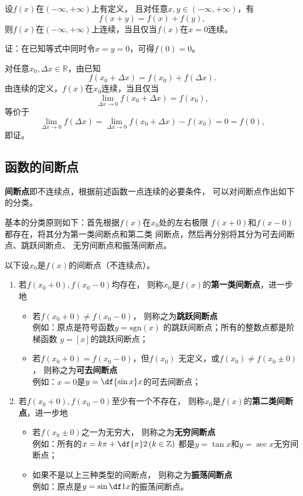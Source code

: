 \bs
\egz 
设$f(x)$在$(-\infty,+\infty)$上有定义，
且对任意$x,y\in (-\infty,+\infty)$，有
$$f(x+y)=f(x)+f(y),$$
则$f(x)$在$(-\infty,+\infty)$上连续，当且仅当$f(x)$在$x=0$连续。

证：在已知等式中同时令$x=y=0$，可得$f(0)=0$。

对任意$x_0,\Delta x\in\mathbb{R}$，由已知
$$f(x_0+\Delta x)=f(x_0)+f(\Delta x).$$
由连续的定义，$f(x)$在$x_0$连续，当且仅当
$$\lim\limits_{\Delta x\to 0}f(x_0+\Delta x)=f(x_0),$$
等价于
$$\lim\limits_{\Delta x\to 0}f(\Delta x)
=\lim\limits_{\Delta x\to 0}f(x_0+\Delta x)-f(x_0)=0=f(0),$$
即证。\fin


\subsection{函数的间断点}

{\bf 间断点}即不连续点，根据前述函数一点连续的必要条件，
可以对间断点作出如下的分类。

基本的分类原则如下：首先根据$f(x)$在$x_0$处的左右极限
$f(x+0)$和$f(x-0)$都存在，将其分为第一类间断点和第二类
间断点，然后再分别将其分为可去间断点、跳跃间断点、
无穷间断点和振荡间断点。

\begin{thx}
	以下设$x_0$是$f(x)$的间断点（不连续点）。
	\begin{enumerate}[(1)]
		\item 若$f(x_0+0),f(x_0-0)$均存在，
		则称$x_0$是$f(x)$的{\bf 第一类间断点}，进一步地
		\begin{itemize}
			\item 若$f(x_0+0)\ne f(x_0-0)$，
			则称之为{\bf 跳跃间断点}\\
			\quad 例如：原点是符号函数$y=\mathrm{sgn}(x)$
			的跳跃间断点；所有的整数点都是阶梯函数
			$y=[x]$的跳跃间断点；
			\item 若$f(x_0+0)=f(x_0-0)$，但$f(x_0)$
			无定义，或$f(x_0)\ne f(x_0\pm0)$，
			则称之为{\bf 可去间断点}\\
			\quad 例如：$x=0$是$y=\df{\sin x}x$的可去间断点；
		\end{itemize}
		\item 若$f(x_0+0),f(x_0-0)$至少有一个不存在，
		则称$x_0$是$f(x)$的{\bf 第二类间断点}，进一步地
		\begin{itemize}
			\item 若$f(x_0\pm0)$之一为无穷大，
			则称之为{\bf 无穷间断点}\\
			\quad 例如：所有的$x=k\pi+\df{\pi}2\,(k\in\mathbb{Z})$
			都是$y=\tan x$和$y=\sec x$无穷间断点；
			\item 如果不是以上三种类型的间断点，
			则称之为{\bf 振荡间断点}\\
			\quad 例如：原点是$y=\sin\df1x$的振荡间断点。
		\end{itemize}
	\end{enumerate}
\end{thx}

